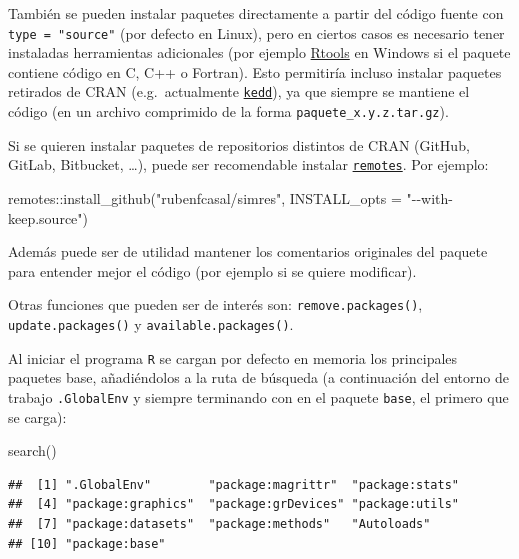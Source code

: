 \documentclass[
]{book}
\newenvironment{Shaded}{\begin{snugshade}}{\end{snugshade}}
\newcommand{\AttributeTok}[1]{\textcolor[rgb]{0.77,0.63,0.00}{#1}}
\newcommand{\FunctionTok}[1]{\textcolor[rgb]{0.00,0.00,0.00}{#1}}
\newcommand{\NormalTok}[1]{#1}
\newcommand{\SpecialCharTok}[1]{\textcolor[rgb]{0.00,0.00,0.00}{#1}}
\newcommand{\StringTok}[1]{\textcolor[rgb]{0.31,0.60,0.02}{#1}}
\theoremstyle{break}
\theoremstyle{nonumberplain}
\begin{document}
También se pueden instalar paquetes directamente a partir del código fuente con \texttt{type\ =\ "source"} (por defecto en Linux), pero en ciertos casos es necesario tener instaladas herramientas adicionales (por ejemplo \href{https://cran.r-project.org/bin/windows/Rtools}{Rtools} en Windows si el paquete contiene código en C, C++ o Fortran).
Esto permitiría incluso instalar paquetes retirados de CRAN (e.g.~actualmente \href{https://CRAN.R-project.org/package=kedd}{\texttt{kedd}}), ya que siempre se mantiene el código (en un archivo comprimido de la forma \texttt{paquete\_x.y.z.tar.gz}).

Si se quieren instalar paquetes de repositorios distintos de CRAN (GitHub, GitLab, Bitbucket, \ldots), puede ser recomendable instalar \href{https://remotes.r-lib.org/}{\texttt{remotes}}.
Por ejemplo:

\begin{Shaded}
\begin{Highlighting}[]
\NormalTok{remotes}\SpecialCharTok{::}\FunctionTok{install\_github}\NormalTok{(}\StringTok{"rubenfcasal/simres"}\NormalTok{, }\AttributeTok{INSTALL\_opts =} \StringTok{"{-}{-}with{-}keep.source"}\NormalTok{)}
\end{Highlighting}
\end{Shaded}

Además puede ser de utilidad mantener los comentarios originales del paquete para entender mejor el código (por ejemplo si se quiere modificar).

Otras funciones que pueden ser de interés son: \texttt{remove.packages()}, \texttt{update.packages()} y \texttt{available.packages()}.

Al iniciar el programa \texttt{R} se cargan por defecto en memoria los principales paquetes base, añadiéndolos a la ruta de búsqueda (a continuación del entorno de trabajo \texttt{.GlobalEnv} y siempre terminando con en el paquete \texttt{base}, el primero que se carga):

\begin{Shaded}
\begin{Highlighting}[]
\FunctionTok{search}\NormalTok{()}
\end{Highlighting}
\end{Shaded}

\begin{verbatim}
##  [1] ".GlobalEnv"        "package:magrittr"  "package:stats"    
##  [4] "package:graphics"  "package:grDevices" "package:utils"    
##  [7] "package:datasets"  "package:methods"   "Autoloads"        
## [10] "package:base"
\end{verbatim}
\end{document}
